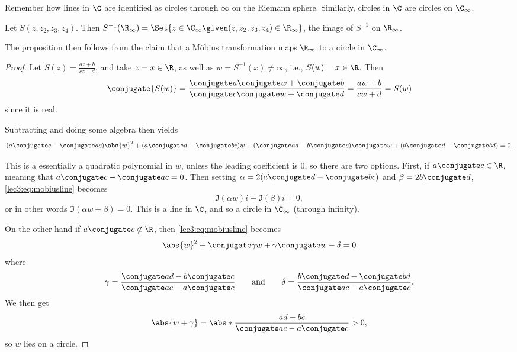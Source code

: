 


Remember how lines in $\C$ are identified as circles through $\infty$ on the Riemann sphere.
Similarly, circles in $\C$ are circles on $\C_\infty$.

Let $S(z, z_2, z_3, z_4)$.
Then $S^{-1}(\R_\infty) = \Set{z \in \C_\infty \given (z, z_2, z_3, z_4) \in \R_\infty}$, the image of $S^{-1}$ on $\R_\infty$.

The proposition then follows from the claim that a Möbius transformation maps $\R_\infty$ to a circle in $\C_\infty$.

\begin{proof}
	Let $S(z) = \frac{a z + b}{c z + d}$, and take $z = x \in \R$, as well as $w = S^{-1}(x) \neq \infty$, i.e., $S(w) = x \in \R$.
	Then
	\[
		\conjugate{S(w)} = \frac{\conjugate a \conjugate w + \conjugate b}{\conjugate c \conjugate w + \conjugate d} = \frac{a w + b}{c w + d} = S(w)
	\]
	since it is real.

	Subtracting and doing some algebra then yields
	\begin{equation}\label{lec3:eq:mobiusline}
		(a \conjugate c - \conjugate a c) \abs{w}^2 + (a \conjugate d - \conjugate b c) w + (\conjugate a d - b \conjugate c) \conjugate w + (b \conjugate d - \conjugate b d) = 0.
	\end{equation}

	This is a essentially a quadratic polynomial in $w$, unless the leading coefficient is $0$, so there are two options.
	First, if $a \conjugate c \in \R$, meaning that $a \conjugate c - \conjugate a c = 0$.
	Then setting $\alpha = 2 (a \conjugate d - \conjugate b c)$ and $\beta = 2 b \conjugate d$, \autoref{lec3:eq:mobiusline} becomes
	\[
		\Im(\alpha w) i + \Im(\beta) i = 0,
	\]
	or in other words $\Im(\alpha w + \beta) = 0$.
	This is a line in $\C$, and so a circle in $\C_\infty$ (through infinity).

	On the other hand if $a \conjugate c \not\in \R$, then \autoref{lec3:eq:mobiusline} becomes
	\[
		\abs{w}^2 + \conjugate \gamma w + \gamma \conjugate w - \delta = 0
	\]
	where
	\[
		\gamma = \frac{\conjugate a d - b \conjugate c}{\conjugate a c - a \conjugate c} \qquad \text{and} \qquad \delta = \frac{b \conjugate d - \conjugate b d}{\conjugate a c - a \conjugate c}.
	\]
	We then get
	\[
		\abs{w + \gamma} = \abs*{\frac{a d - b c}{\conjugate a c - a \conjugate c}} > 0,
	\]
	so $w$ lies on a circle.
\end{proof}


